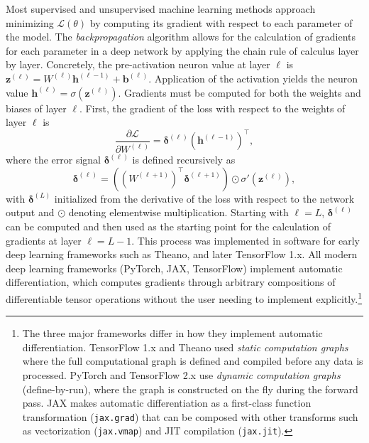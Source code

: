 Most supervised and unsupervised machine learning methods approach minimizing $\mathcal{L}(\theta)$ by computing its gradient with respect to each parameter of the model.
The \textit{backpropagation} algorithm allows for the calculation of gradients for each parameter in a deep network by applying the chain rule of calculus layer by layer.
Concretely, the pre-activation neuron value at layer $\ell$ is $\mathbf{z}^{(\ell)} = W^{(\ell)} \mathbf{h}^{(\ell-1)} + \mathbf{b}^{(\ell)}$.
Application of the activation yields the neuron value $\mathbf{h}^{(\ell)} = \sigma(\mathbf{z}^{(\ell)})$.
Gradients must be computed for both the weights and biases of layer $\ell$.
First, the gradient of the loss with respect to the weights of layer $\ell$ is
\begin{equation}
    \frac{\partial \mathcal{L}}{\partial W^{(\ell)}} = \boldsymbol{\delta}^{(\ell)} \left(\mathbf{h}^{(\ell-1)}\right)^\top,
    \label{eqn:backprop_W}
\end{equation}
where the error signal $\boldsymbol{\delta}^{(\ell)}$ is defined recursively as
\begin{equation}
    \boldsymbol{\delta}^{(\ell)} = \left( \left(W^{(\ell+1)}\right)^\top \boldsymbol{\delta}^{(\ell+1)} \right) \odot \sigma'\!\left(\mathbf{z}^{(\ell)}\right),
    \label{eqn:backprop_delta}
\end{equation}
with $\boldsymbol{\delta}^{(L)}$ initialized from the derivative of the loss with respect to the network output and $\odot$ denoting elementwise multiplication.
Starting with $\ell = L$, $\boldsymbol{\delta}^{(\ell)}$ can be computed and then used as the starting point for the calculation of gradients at layer $\ell = L - 1$.
This process was implemented in software for early deep learning frameworks such as Theano, and later TensorFlow 1.x.
All modern deep learning frameworks (PyTorch, JAX, TensorFlow) implement automatic differentiation, which computes gradients through arbitrary compositions of differentiable tensor operations without the user needing to implement  explicitly.\footnote{The three major frameworks differ in how they implement automatic differentiation. TensorFlow 1.x and Theano used \textit{static computation graphs} where the full computational graph is defined and compiled before any data is processed. PyTorch and TensorFlow 2.x use \textit{dynamic computation graphs} (define-by-run), where the graph is constructed on the fly during the forward pass. JAX makes automatic differentiation as a first-class function transformation (\texttt{jax.grad}) that can be composed with other transforms such as vectorization (\texttt{jax.vmap}) and JIT compilation (\texttt{jax.jit}).}

